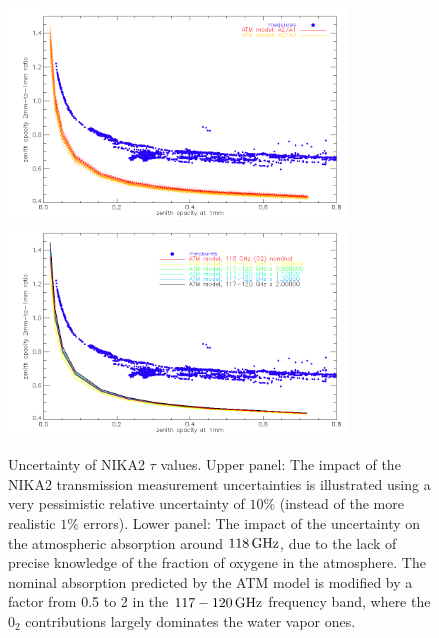 \begin{figure}[ht]
\begin{center}
  \includegraphics[width=0.8\textwidth]{Figures/opacity_tau1_tau2_ratio_bperror10pc_N2R9_N2R10.png}
  \includegraphics[width=0.8\textwidth]{Figures/opacity_tau1_tau2_ratio_o2fraction_N2R9_N2R10.png}
\caption{Uncertainty of NIKA2 $\tau$ values. Upper panel: The impact
  of the NIKA2 transmission measurement uncertainties is illustrated
  using a very pessimistic relative uncertainty of $10\%$ (instead of
  the more realistic $1\%$ errors). Lower panel: The impact of the
uncertainty on the atmospheric absorption around $118\, \rm{GHz}$, due
to the lack of precise knowledge of the fraction of oxygene in the
atmosphere. The nominal absorption predicted by the ATM model is
modified by a factor from 0.5 to 2 in the $117-120\, \rm{GHz}$
frequency band, where the $0_2$ contributions largely dominates the
water vapor ones. }
  \label{fig:opacity_errors}
\end{center}
\end{figure}

